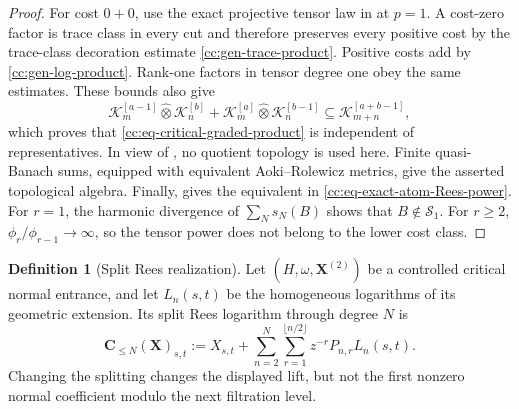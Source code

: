 \documentclass[10pt,reqno]{amsart}
\theoremstyle{plain}
\theoremstyle{definition}
\newtheorem{definition}[theorem]{Definition}
\theoremstyle{remark}
\begin{document}
\begin{proof}
For cost \(0+0\), use the exact projective tensor law in
 at \(p=1\).  A
cost-zero factor is trace class in every cut and therefore preserves every
positive cost by the trace-class decoration estimate
\eqref{cc:gen-trace-product}.  Positive costs add by
\eqref{cc:gen-log-product}.  Rank-one factors in tensor degree one obey the
same estimates.  These bounds also give
\[
 \mathscr K_m^{[a-1]}\widehat\otimes\mathscr K_n^{[b]}
 +\mathscr K_m^{[a]}\widehat\otimes\mathscr K_n^{[b-1]}
 \subseteq\mathscr K_{m+n}^{[a+b-1]},
\]
which proves that \eqref{cc:eq-critical-graded-product} is independent of
representatives.  In view of , no
quotient topology is used here.  Finite quasi-Banach sums, equipped with equivalent
Aoki--Rolewicz metrics, give the asserted topological algebra.  Finally,
 gives the equivalent in
\eqref{cc:eq-exact-atom-Rees-power}.  For \(r=1\), the harmonic divergence
of \(\sum_Ns_N(B)\) shows that \(B\notin\mathcal S_1\).  For \(r\ge2\),
\(\phi_r/\phi_{r-1}\to\infty\), so the tensor power does not belong to the
lower cost class.
\end{proof}

\begin{definition}[Split Rees realization]
\label{cc:def-critical-rees-compiler}
Let \((H,\omega,{\mathbf X}^{(2)})\) be a controlled critical normal
entrance, and let \(L_n(s,t)\) be the homogeneous logarithms of its geometric
extension.  Its split Rees logarithm through degree \(N\) is
\begin{equation}
 \mathbf C_{\le N}({\mathbf X})_{s,t}
 :=X_{s,t}+\sum_{n=2}^N\sum_{r=1}^{\lfloor n/2\rfloor}
 z^{-r}P_{n,r}L_n(s,t).
 \label{cc:eq-critical-rees-compiler}
\end{equation}
Changing the splitting changes the displayed lift, but not the first nonzero
normal coefficient modulo the next filtration level.
\end{definition}
\end{document}
